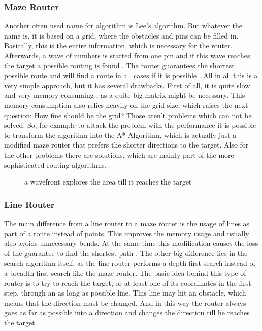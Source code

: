 \subsubsection{Maze Router}
Another often used name for algorithm is Lee's algorithm. But whatever the name is, it is based on a grid, where the obstacles and pins can be filled in. Basically, this is the entire information, which is necessary for the router. Afterwards, a wave of numbers is started from one pin and if this wave reaches the target a possible routing is found . The router guarantees the shortest possible route and will find a route in all cases if it is possible \cite[p. 693]{kaufmann:electronic_design_automation}. All in all this is a very simple approach, but it has several drawbacks. First of all, it is quite slow and very memory consuming \cite[p. 693]{kaufmann:electronic_design_automation}, as a quite big matrix might be necessary. This memory consumption also relies heavily on the grid size, which raises the next question: How fine should be the grid? Those aren't problems which can not be solved. So, for example to attack the problem with the performance it is possible to transform the algorithm into the A*-Algorithm, which is actually just a modified maze router that prefers the shorter directions to the target. Also for the other problems there are solutions, which are mainly part of the more sophisticated routing algorithms.

\begin{figure}
	\centering
	
	\caption{a wavefront explores the area till it reaches the target}
	\label{fig:maze_router}
\end{figure}

\subsubsection{Line Router}
The main difference from a line router to a maze router is the usage of lines as part of a route instead of points. This improves the memory usage and usually also avoids unnecessary bends. At the same time this modification causes the loss of the guarantee to find the shortest path \cite[p. 695]{kaufmann:electronic_design_automation}. The other big difference lies in the search algorithm itself, as the line router performs a depth-first search instead of a breadth-first search like the maze router. The basic idea behind this type of router is to try to reach the target, or at least one of its coordinates in the first step, through an as long as possible line. This line may hit an obstacle, which means that the direction must be changed. And in this way the router always goes as far as possible into a direction and changes the direction till he reaches the target.

